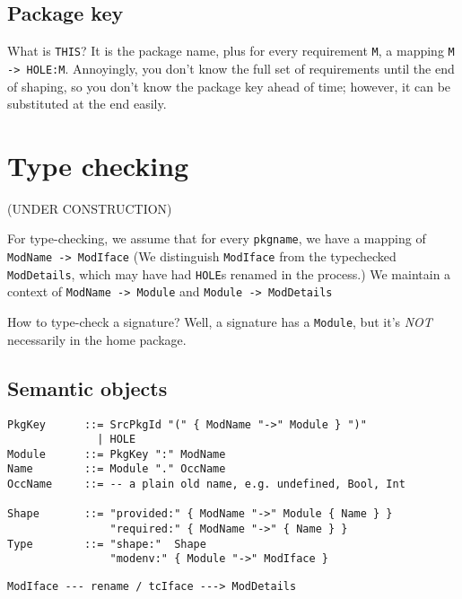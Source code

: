 \documentclass{article}
\begin{document}
\subsection{Package key}

What is \verb|THIS|?  It is the package name, plus for every requirement \verb|M|,
a mapping \verb|M -> HOLE:M|.  Annoyingly, you don't know the full set of
requirements until the end of shaping, so you don't know the package key ahead of time;
however, it can be substituted at the end easily.

\newpage

\section{Type checking}

(UNDER CONSTRUCTION)

%
%

For type-checking, we assume that for every \verb|pkgname|, we have a mapping of \verb|ModName -> ModIface| (We distinguish \verb|ModIface| from the typechecked \verb|ModDetails|, which may have had \verb|HOLE|s renamed in the process.)  We maintain a context of \verb|ModName -> Module| and \verb|Module -> ModDetails|

How to type-check a signature?  Well, a signature has a \verb|Module|, but it's \emph{NOT} necessarily in the home package.

\subsection{Semantic objects}

\begin{verbatim}
PkgKey      ::= SrcPkgId "(" { ModName "->" Module } ")"
              | HOLE
Module      ::= PkgKey ":" ModName
Name        ::= Module "." OccName
OccName     ::= -- a plain old name, e.g. undefined, Bool, Int

Shape       ::= "provided:" { ModName "->" Module { Name } }
                "required:" { ModName "->" { Name } }
Type        ::= "shape:"  Shape
                "modenv:" { Module "->" ModIface }
\end{verbatim}

\begin{verbatim}
ModIface --- rename / tcIface ---> ModDetails
\end{verbatim}
\end{document}
